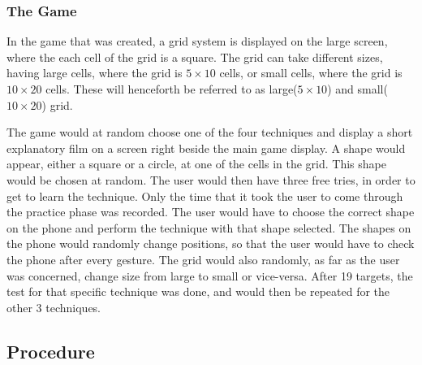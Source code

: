 \subsubsection{The Game}


In the game that was created, a grid system is displayed on the large screen, where the each cell of the grid is a square. The grid can take different sizes, having large cells, where the grid is $5 \times 10$ cells, or small cells, where the grid is $10 \times 20$ cells. These will henceforth be referred to as large($5 \times 10$) and small($10 \times 20$) grid.

The game would at random choose one of the four techniques and display a short explanatory film on a screen right beside the main game display. A shape would appear, either a square or a circle, at one of the cells in the grid. This shape would be chosen at random. The user would then have three free tries, in order to get to learn the technique. Only the time that it took the user to come through the practice phase was recorded. The user would have to choose the correct shape on the phone and perform the technique with that shape selected. The shapes on the phone would randomly change positions, so that the user would have to check the phone after every gesture. The grid would also randomly, as far as the user was concerned, change size from large to small or vice-versa. After 19 targets, the test for that specific technique was done, and would then be repeated for the other 3 techniques. 

\subsection{Procedure}





